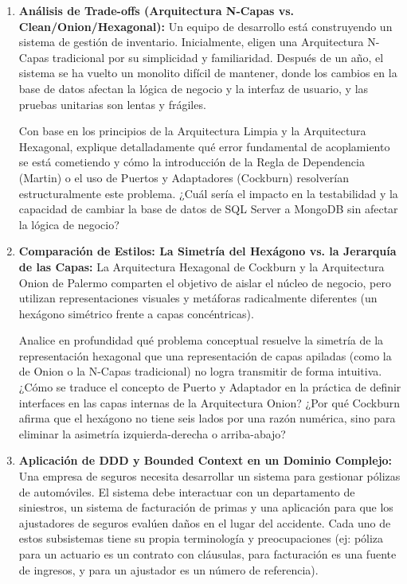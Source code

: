 \documentclass[12pt,a4paper]{article}
\begin{document}
\begin{enumerate}[label=\textbf{\arabic*.}, leftmargin=*, itemsep=1.2em]

  \item \textbf{Análisis de Trade-offs (Arquitectura N-Capas vs. Clean/Onion/Hexagonal):}
  Un equipo de desarrollo está construyendo un sistema de gestión de inventario. Inicialmente, eligen una Arquitectura N-Capas tradicional por su simplicidad y familiaridad. Después de un año, el sistema se ha vuelto un monolito difícil de mantener, donde los cambios en la base de datos afectan la lógica de negocio y la interfaz de usuario, y las pruebas unitarias son lentas y frágiles.

  Con base en los principios de la Arquitectura Limpia y la Arquitectura Hexagonal, explique detalladamente qué error fundamental de acoplamiento se está cometiendo y cómo la introducción de la Regla de Dependencia (Martin) o el uso de Puertos y Adaptadores (Cockburn) resolverían estructuralmente este problema. ¿Cuál sería el impacto en la testabilidad y la capacidad de cambiar la base de datos de SQL Server a MongoDB sin afectar la lógica de negocio?

  \item \textbf{Comparación de Estilos: La Simetría del Hexágono vs. la Jerarquía de las Capas:}
  La Arquitectura Hexagonal de Cockburn y la Arquitectura Onion de Palermo comparten el objetivo de aislar el núcleo de negocio, pero utilizan representaciones visuales y metáforas radicalmente diferentes (un hexágono simétrico frente a capas concéntricas).

  Analice en profundidad qué problema conceptual resuelve la simetría de la representación hexagonal que una representación de capas apiladas (como la de Onion o la N-Capas tradicional) no logra transmitir de forma intuitiva. ¿Cómo se traduce el concepto de Puerto y Adaptador en la práctica de definir interfaces en las capas internas de la Arquitectura Onion? ¿Por qué Cockburn afirma que el hexágono no tiene seis lados por una razón numérica, sino para eliminar la asimetría izquierda-derecha o arriba-abajo?

  \item \textbf{Aplicación de DDD y Bounded Context en un Dominio Complejo:}
  Una empresa de seguros necesita desarrollar un sistema para gestionar pólizas de automóviles. El sistema debe interactuar con un departamento de siniestros, un sistema de facturación de primas y una aplicación para que los ajustadores de seguros evalúen daños en el lugar del accidente. Cada uno de estos subsistemas tiene su propia terminología y preocupaciones (ej: póliza para un actuario es un contrato con cláusulas, para facturación es una fuente de ingresos, y para un ajustador es un número de referencia).


\end{enumerate}
\end{document}
